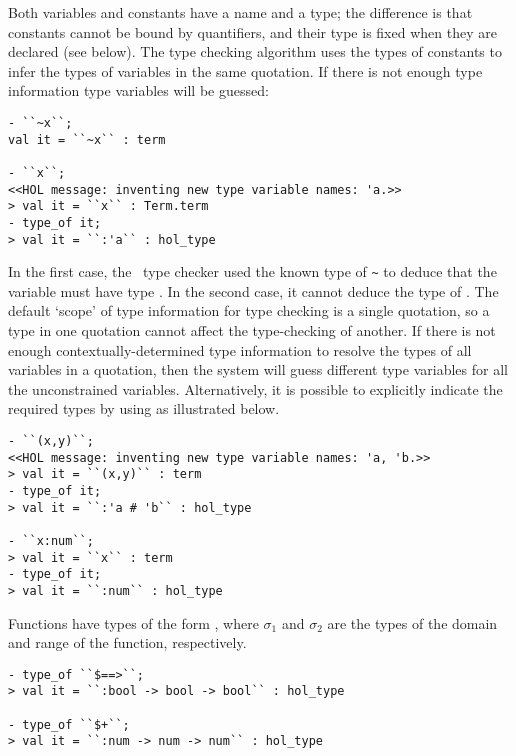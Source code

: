 Both variables and constants have a name and a type; the difference is
that constants cannot be bound by quantifiers, and their type is fixed
when they are declared (see below). The type checking algorithm uses
the types of constants to infer the types of variables in the same
quotation. If there is not enough type information type variables will
be guessed:

\begin{session}\begin{verbatim}
- ``~x``;
val it = ``~x`` : term

- ``x``;
<<HOL message: inventing new type variable names: 'a.>>
> val it = ``x`` : Term.term
- type_of it;
> val it = ``:'a`` : hol_type
\end{verbatim}\end{session}

    In the first case, the \HOL\ type checker used the known type
     of {\small\verb|~|} to deduce that the variable
     must have type .  In the second case, it cannot
    deduce the type of .  The default `scope' of type
    information for type checking is a single quotation, so a type in
    one quotation cannot affect the type-checking of another.  If
    there is not enough contextually-determined type information to
    resolve the types of all variables in a quotation, then the system
    will guess different type variables for all the unconstrained
    variables.  Alternatively, it is possible to explicitly indicate
    the required types by using  as illustrated
    below.

\begin{session}\begin{verbatim}
- ``(x,y)``;
<<HOL message: inventing new type variable names: 'a, 'b.>>
> val it = ``(x,y)`` : term
- type_of it;
> val it = ``:'a # 'b`` : hol_type

- ``x:num``;
> val it = ``x`` : term
- type_of it;
> val it = ``:num`` : hol_type
\end{verbatim}\end{session}

    Functions have types of the form ,
    where $\sigma_1$ and $\sigma_2$ are the types of the domain and
    range of the function, respectively.

\begin{session}\begin{verbatim}
- type_of ``$==>``;
> val it = ``:bool -> bool -> bool`` : hol_type

- type_of ``$+``;
> val it = ``:num -> num -> num`` : hol_type
\end{verbatim}\end{session}

